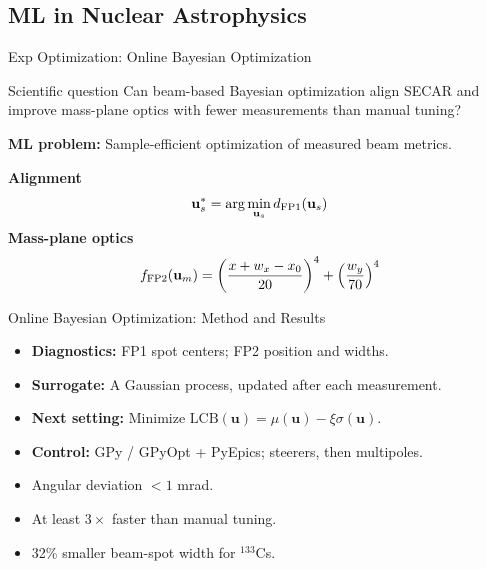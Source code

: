 \subsection{ML in Nuclear Astrophysics}
\setsource{}
\begin{frame}[c,label=md-19]

\end{frame}

\begin{frame}[c,label=md-34]{Exp Optimization: Online Bayesian Optimization}
\small
\begin{block}{Scientific question}
Can beam-based Bayesian optimization align SECAR and improve mass-plane
optics with fewer measurements than manual tuning?
\end{block}
\smallskip
\textbf{ML problem:} Sample-efficient optimization of measured beam metrics.
\vspace{0.3cm}

\medskip
\textbf{Alignment}
\[
\mathbf u_s^*=\arg\min_{\mathbf u_s}d_{\rm FP1}(\mathbf u_s)
\]
\smallskip
\textbf{Mass-plane optics}
\[
f_{\rm FP2}(\mathbf u_m)=
\left(\frac{x+w_x-x_0}{20}\right)^4+
\left(\frac{w_y}{70}\right)^4
\]
\end{frame}

\begin{frame}[t,label=md-35]{Online Bayesian Optimization: Method and Results}
\small
{}
\smallskip
\begin{itemize}
\setlength{\itemsep}{0.45em}
    \item \textbf{Diagnostics:} FP1 spot centers; FP2 position and widths.
    \item \textbf{Surrogate:} A Gaussian process, updated after each measurement.
    \item \textbf{Next setting:} Minimize $\mathrm{LCB}(\mathbf u)=\mu(\mathbf u)-\xi\sigma(\mathbf u)$.
    \item \textbf{Control:} GPy / GPyOpt + PyEpics; steerers, then multipoles.
\end{itemize}
\medskip
{}
\smallskip
\begin{itemize}
\setlength{\itemsep}{0.4em}
    \item Angular deviation $<1$ mrad.
    \item At least \alert{$3\times$ faster} than manual tuning.
    \item \alert{32\%} smaller beam-spot width for $^{133}$Cs.
\end{itemize}
\end{frame}

